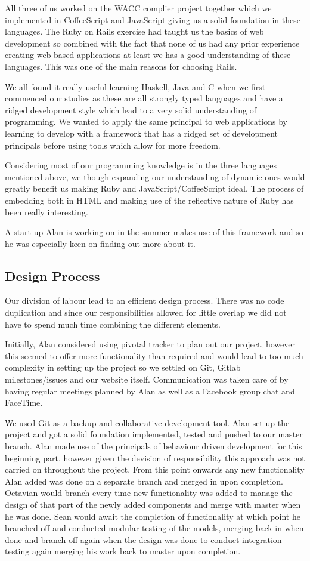 \documentclass[a4wide, 11pt]{article}
\begin{document}
All three of us worked on the WACC complier project together which we implemented in CoffeeScript and JavaScript giving us a solid foundation in these languages. The Ruby on Rails exercise had taught us the basics of web development so combined with the fact that none of us had any prior experience creating web based applications at least we has a good understanding of these languages. This was one of the main reasons for choosing Rails. 

We all found it really useful learning Haskell, Java and C when we first commenced our studies as these are all strongly typed languages and have a ridged development style which lead to a very solid understanding of programming. We wanted to apply the same principal to web applications by learning to develop with a framework that has a ridged set of development principals before using tools which allow for more freedom. 

Considering most of our programming knowledge is in the three languages mentioned above, we though expanding our understanding of dynamic ones would greatly benefit us making Ruby and JavaScript/CoffeeScript ideal. The process of embedding both in HTML and making use of the reflective nature of Ruby has been really interesting.

A start up Alan is working on in the summer makes use of this framework and so he was especially keen on finding out more about it. 

\subsection{Design Process}
Our division of labour lead to an efficient design process. There was no code duplication and since our responsibilities allowed for little overlap we did not have to spend much time combining the different elements. 

Initially, Alan considered using pivotal tracker to plan out our project, however this seemed to offer more functionality than required and would lead to too much complexity in setting up the project so we settled on Git, Gitlab milestones/issues and our website itself. Communication was taken care of by having regular meetings planned by Alan as well as a Facebook group chat and FaceTime. 

We used Git as a backup and collaborative development tool. Alan set up the project and got a solid foundation implemented, tested and pushed to our master branch. Alan made use of the principals of behaviour driven development for this beginning part, however given the devision of responsibility this approach was not carried on throughout the project.
From this point onwards any new functionality Alan added was done on a separate branch and merged in upon completion. 
Octavian would branch every time new functionality was added to manage the design of that part of the newly added components and merge with master when he was done. 
Sean would await the completion of functionality at which point he branched off and conducted modular testing of the models, merging back in when done and branch off again when the design was done to conduct integration testing again merging his work back to master upon completion. 
\end{document}
